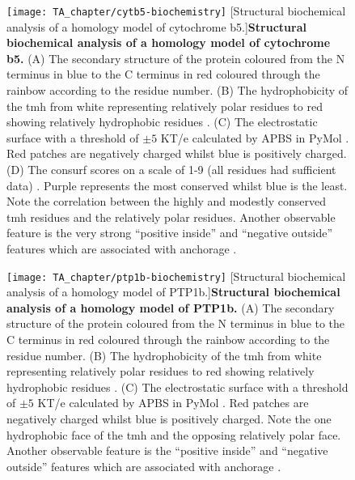 \begin{figure}[!ht]
\centering
\texttt{[image: TA\_chapter/cytb5-biochemistry]}
        [Structural biochemical analysis of a homology model of cytochrome b5.]{\textbf{Structural biochemical analysis of a homology model of cytochrome b5.}
        (A) The secondary structure of the protein coloured from the N terminus in blue to the C terminus in red coloured through the rainbow according to the residue number.
        (B) The hydrophobicity of the \gls{tmh} from white representing relatively polar residues to red showing relatively hydrophobic residues \cite{Eisenberg1984}.
        (C) The electrostatic surface with a threshold of $\pm5$ KT/e calculated by APBS in PyMol \cite{Baker2001}.
        Red patches are negatively charged whilst blue is positively charged.
        (D) The consurf scores on a scale of 1-9 (all residues had sufficient data) \cite{Ashkenazy2010}. Purple represents the most conserved whilst blue is the least.
        Note the correlation between the highly and modestly conserved \gls{tmh} residues and the relatively polar residues.
        Another observable feature is the very strong ``positive inside'' \cite{VonHeijne1989, Andersson1992, Sharpe2010, Baeza-Delgado2013, Pogozheva2013} and ``negative outside'' features which are associated with anchorage \cite{Baker2017}.
}

\label{fig:cytb5-biochemistry}
\end{figure}


\begin{figure}[!ht]
\centering
\texttt{[image: TA\_chapter/ptp1b-biochemistry]}
        [Structural biochemical analysis of a homology model of PTP1b.]{\textbf{Structural biochemical analysis of a homology model of PTP1b.}
        (A) The secondary structure of the protein coloured from the N terminus in blue to the C terminus in red coloured through the rainbow according to the residue number.
        (B) The hydrophobicity of the \gls{tmh} from white representing relatively polar residues to red showing relatively hydrophobic residues \cite{Eisenberg1984}.
        (C) The electrostatic surface with a threshold of $\pm5$ KT/e calculated by APBS in PyMol \cite{Baker2001}.
        Red patches are negatively charged whilst blue is positively charged.
        Note the one hydrophobic face of the \gls{tmh} and the opposing relatively polar face.
        Another observable feature is the ``positive inside'' \cite{VonHeijne1989, Andersson1992, Sharpe2010, Baeza-Delgado2013, Pogozheva2013} and ``negative outside'' features which are associated with anchorage \cite{Baker2017}.
}

\label{fig:ptp1b-biochemistry}
\end{figure}

